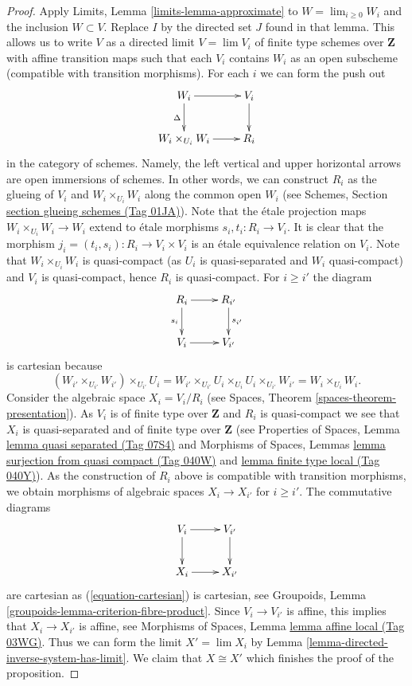 \documentclass{amsart}
\theoremstyle{plain}
\theoremstyle{definition}
\theoremstyle{remark}
\numberwithin{equation}{subsection}
\def\lim{\mathop{\mathrm{lim}}\nolimits}
\begin{document}
\begin{proof}
\medskip\noindent
Apply Limits, Lemma \ref{limits-lemma-approximate} to
$W = \lim_{i \geq 0} W_i$ and the inclusion $W \subset V$. Replace $I$
by the directed set $J$ found in that lemma. This allows us
to write $V$ as a directed limit $V = \lim V_i$ of finite type schemes over
$\mathbf{Z}$ with affine transition maps such that each $V_i$ contains
$W_i$ as an open subscheme (compatible with transition morphisms).
For each $i$ we can form the push out
$$
\xymatrix{
W_i \ar[r] \ar[d]_\Delta & V_i \ar[d] \\
W_i \times_{U_i} W_i \ar[r] & R_i
}
$$
in the category of schemes. Namely, the left vertical and upper horizontal
arrows are open immersions of schemes. In other words, we can construct
$R_i$ as the glueing of $V_i$ and $W_i \times_{U_i} W_i$ along the common open
$W_i$ (see Schemes, Section \href{https://stacks.math.columbia.edu/tag/01JA}{section glueing schemes (Tag 01JA)}). Note that
the \'etale projection maps $W_i \times_{U_i} W_i \to W_i$ extend
to \'etale morphisms $s_i, t_i : R_i \to V_i$. It is clear that the
morphism $j_i = (t_i, s_i) : R_i \to V_i \times V_i$ is an \'etale
equivalence relation on $V_i$. Note that $W_i \times_{U_i} W_i$ is
quasi-compact (as $U_i$ is quasi-separated and $W_i$ quasi-compact)
and $V_i$ is quasi-compact, hence $R_i$ is quasi-compact. For
$i \geq i'$ the diagram
\begin{equation}
\label{equation-cartesian}
\vcenter{
\xymatrix{
R_i \ar[r] \ar[d]_{s_i} & R_{i'} \ar[d]^{s_{i'}} \\
V_i \ar[r] & V_{i'}
}
}
\end{equation}
is cartesian because
$$
(W_{i'} \times_{U_{i'}} W_{i'}) \times_{U_{i'}} U_i =
W_{i'} \times_{U_{i'}} U_i \times_{U_i} U_i \times_{U_{i'}} W_{i'} =
W_i \times_{U_i} W_i.
$$
Consider the algebraic space $X_i = V_i/R_i$ (see
Spaces, Theorem \ref{spaces-theorem-presentation}).
As $V_i$ is of finite type over $\mathbf{Z}$ and $R_i$ is quasi-compact
we see that $X_i$ is quasi-separated and of finite type over $\mathbf{Z}$
(see
Properties of Spaces, Lemma \href{https://stacks.math.columbia.edu/tag/07S4}{lemma quasi separated (Tag 07S4)}
and
Morphisms of Spaces, Lemmas
\href{https://stacks.math.columbia.edu/tag/040W}{lemma surjection from quasi compact (Tag 040W)} and
\href{https://stacks.math.columbia.edu/tag/040Y}{lemma finite type local (Tag 040Y)}).
As the construction of $R_i$ above is compatible
with transition morphisms, we obtain morphisms of algebraic spaces
$X_i \to X_{i'}$ for $i \geq i'$. The commutative diagrams
$$
\xymatrix{
V_i \ar[r] \ar[d] & V_{i'} \ar[d] \\
X_i \ar[r] & X_{i'}
}
$$
are cartesian as (\ref{equation-cartesian}) is cartesian, see
Groupoids, Lemma \ref{groupoids-lemma-criterion-fibre-product}.
Since $V_i \to V_{i'}$ is affine, this implies that $X_i \to X_{i'}$
is affine, see
Morphisms of Spaces, Lemma \href{https://stacks.math.columbia.edu/tag/03WG}{lemma affine local (Tag 03WG)}.
Thus we can form the limit $X' = \lim X_i$ by
Lemma \ref{lemma-directed-inverse-system-has-limit}.
We claim that $X \cong X'$ which finishes the proof of the proposition.


\end{proof}
\end{document}
